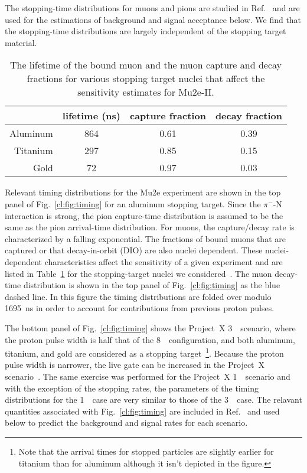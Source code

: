 The stopping-time distributions for muons and pions are studied in
Ref.~\cite{Mu2eII} and are used for the estimations of background and
signal acceptance below.  We find that the stopping-time distributions
are largely independent of the stopping target material.
   

\begin{table}[tb]
  \centering
  \begin{tabular}{rccc} \hline\hline
           & lifetime (ns) & capture fraction & decay fraction \\ \hline
  Aluminum & 864           & 0.61            & 0.39 \\
  Titanium & 297           & 0.85            & 0.15 \\ \hline\hline
  Gold     &  72           & 0.97            & 0.03     \\ \hline\hline
  \end{tabular}
  \caption{The lifetime of the bound muon and the muon capture and decay     
    fractions for various stopping target nuclei that affect the 
    sensitivity estimates for Mu2e-II. 
  }
  \label{cl:tab:nucleistuff}
\end{table}
  
Relevant timing distributions for the Mu2e experiment are shown in the
top panel of Fig.~\ref{cl:fig:timing} for an aluminum stopping
target. Since the $\pi^-$-N interaction is strong, the pion
capture-time distribution is assumed to be the same as the pion
arrival-time distribution.  For muons, the capture/decay rate is
characterized by a falling exponential.  The fractions of bound muons
that are captured or that decay-in-orbit (DIO) are also nuclei
dependent.  These nuclei-dependent characteristics affect the
sensitivity of a given experiment and are listed in
Table~\ref{cl:tab:nucleistuff} for the stopping-target nuclei we
considered~\cite{Suzuki:1987jf}.  The muon decay-time distribution is
shown in the top panel of Fig.~\ref{cl:fig:timing} as the blue dashed
line.  In this figure the timing distributions are folded over modulo
1695~ns in order to account for contributions from previous proton
pulses.

The bottom panel of Fig.~\ref{cl:fig:timing} shows the Project~X
3~\gev\ scenario, where the proton pulse width is half that of the
8~\gev\ configuration, and both aluminum, titanium, and gold are
considered as a stopping target~\footnote{Note that the arrival times
for stopped particles are slightly earlier for titanium than for
aluminum although it isn't depicted in the figure.}. Because the proton
pulse width is narrower, the live gate can be increased in the
Project~X scenario~\cite{MoveLiveGate}.  The same exercise was
performed for the Project~X 1~\gev\ scenario and with the exception of
the stopping rates, the parameters of the timing distributions for the
1~\gev\ case are very similar to those of the 3~\gev\ case.  The
relavant quantities associated with Fig.~\ref{cl:fig:timing} are
included in Ref.~\cite{Mu2eII} and used below to predict the
background and signal rates for each scenario.


